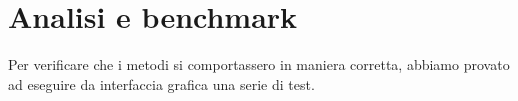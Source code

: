 \section{Analisi e benchmark}

Per verificare che i metodi si comportassero in maniera corretta, abbiamo provato ad eseguire da interfaccia grafica una serie di test.